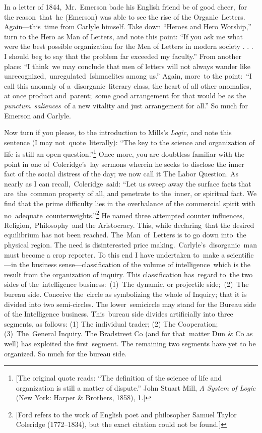 \documentclass[twoside,symmetric,nobib,justified]{tufte-book}
\begin{document}
In a letter of 1844,~Mr.~Emerson bade his English friend be of good
cheer,~for the reason~that~he (Emerson) was able to see the rise of the
Organic~Letters. Again---this~time from Carlyle himself. Take down
``Heroes and Hero Worship,'' turn to the Hero as Man of Letters, and
note this point: ``If you ask me what were the best possible
organization for the Men of Letters in modern society . . . I should beg
to say that the problem far exceeded my faculty.'' From another place:
``I think~we may conclude that men of letters will not always wander
like unrecognized,~unregulated~Ishmaelites among us.'' Again, more~to
the point:~``I call this anomaly of a~disorganic~literary class, the
heart of all other anomalies, at once product and~parent;~some good
arrangement for that would be as the \emph{punctum~saliences}~of a new
vitality and just arrangement for all.'' So much for Emerson and
Carlyle.~

Now turn if you please, to the introduction to Mills's \emph{Logic,} and
note this sentence (I may not~quote~literally): ``The key to the science
and organization of life is still an open question.''\footnote{{[}The
  original quote reads: ``The definition of the science of life and
  organization is still a matter of dispute.'' John Stuart Mill, \emph{A
  System of Logic} (New York: Harper \& Brothers, 1858), 1\emph{.}{]}}
Once more, you are doubtless familiar with the point in one
of~Coleridge's~lay sermons wherein he seeks to disclose the inner fact
of the social distress of the day; we now call it The Labor Question. As
nearly as I can recall,~Coleridge~said: ``Let us sweep away the surface
facts that are~the~common property of all, and penetrate to the~inner,
or spiritual fact. We find that the prime difficulty lies in the
overbalance of the commercial spirit with
no~adequate~counterweights.''\footnote{{[}Ford refers to the work of
  English poet and philosopher Samuel Taylor Coleridge (1772--1834), but
  the exact citation could not be found.{]}} He named three attempted
counter influences, Religion,~Philosophy~and the Aristocracy. This,
while declaring~that the desired equilibrium has not been reached.
The~Man~of~Letters is to go down into~the physical region. The need is
disinterested price making.~Carlyle's~disorganic~man must become a crop
reporter. To this end I have undertaken to~make a scientific---in the
business sense---classification of the volume of intelligence~which is
the result from the organization of inquiry. This classification
has~regard to~the two sides of the~intelligence business:~(1)~The
dynamic, or projectile side;~(2)~The bureau side. Conceive the~circle as
symbolizing the whole of Inquiry; that it is divided into two
semi-circles. The lower~semicircle may stand for the Bureau side of the
Intelligence business. This~bureau side divides artificially into three
segments, as follows: (1) The individual trader; (2) The Cooperation;
(3)~The~General Inquiry. The Bradstreet Co (and for that~matter Dun \&
Co as well) has exploited the first~segment. The remaining two segments
have yet to be organized. So much for the bureau side.~
\end{document}
